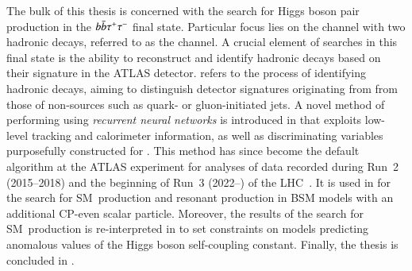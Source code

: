 The bulk of this thesis is concerned with the search for Higgs boson pair
production in the $b\bar{b}\tau^{+} \tau^{-}$ final state. Particular focus lies on the
channel with two hadronic \taulepton decays, referred to as the \hadhad channel.
A crucial element of searches in this final state is the ability to reconstruct
and identify hadronic \taulepton decays based on their signature in the ATLAS
detector. \emph{\Tauid} refers to the process of identifying hadronic \taulepton
decays, aiming to distinguish detector signatures originating from \tauhad from
those of non-\tauhad sources such as quark- or gluon-initiated jets. A novel
method of performing \tauid using \emph{recurrent neural networks} is introduced
in  that exploits low-level tracking and calorimeter
information, as well as discriminating variables purposefully constructed for
\tauid. This method has since become the default \tauid algorithm at the ATLAS
experiment for analyses of data recorded during Run~2 (2015--2018) and the
beginning of Run~3 (2022--) of the
LHC~\cite{ATL-PHYS-PUB-2019-033,ATL-PHYS-PUB-2022-044}. It is used in
 for the search for SM~\HH production and resonant \HH
production in BSM models with an additional CP-even scalar particle. Moreover,
the results of the search for SM~\HH production is re-interpreted in
 to set constraints on models predicting anomalous
values of the Higgs boson self-coupling constant. Finally, the thesis is
concluded in .


